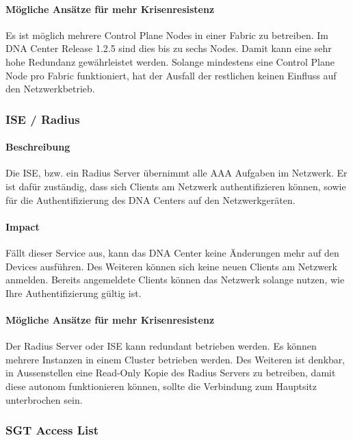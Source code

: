 \paragraph{Mögliche Ansätze für mehr Krisenresistenz}

Es ist möglich mehrere Control Plane Nodes in einer Fabric zu betreiben. Im DNA Center Release 1.2.5 sind dies bis zu sechs Nodes. Damit kann eine sehr hohe Redundanz gewährleistet werden. Solange mindestens eine Control Plane Node pro Fabric funktioniert, hat der Ausfall der restlichen keinen Einfluss auf den Netzwerkbetrieb.

\subsubsection{ISE / Radius}

\paragraph{Beschreibung}

Die ISE, bzw. ein Radius Server übernimmt alle AAA Aufgaben im Netzwerk. Er ist dafür zuständig, dass sich Clients am Netzwerk authentifizieren können, sowie für die Authentifizierung des DNA Centers auf den Netzwerkgeräten.

\paragraph{Impact}

Fällt dieser Service aus, kann das DNA Center keine Änderungen mehr auf den Devices ausführen. Des Weiteren können sich keine neuen Clients am Netzwerk anmelden. Bereits angemeldete Clients können das Netzwerk solange nutzen, wie Ihre Authentifizierung gültig ist.

\paragraph{Mögliche Ansätze für mehr Krisenresistenz}

Der Radius Server oder ISE kann redundant betrieben werden. Es können mehrere Instanzen in einem Cluster betrieben werden. Des Weiteren ist denkbar, in Aussenstellen eine Read-Only Kopie des Radius Servers zu betreiben, damit diese autonom funktionieren können, sollte die Verbindung zum Hauptsitz unterbrochen sein.

\subsubsection{SGT Access List}
